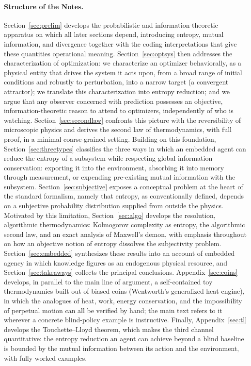 \documentclass[10pt]{article}
\theoremstyle{definition}
\theoremstyle{remark}
\begin{document}
\paragraph{Structure of the Notes.} Section~\ref{sec:prelim} develops the probabilistic and information-theoretic apparatus on which all later sections depend, introducing entropy, mutual information, and divergence together with the coding interpretations that give these quantities operational meaning. Section~\ref{sec:optsys} then addresses the characterization of optimization: we characterize an optimizer behaviorally, as a physical entity that drives the system it acts upon, from a broad range of initial conditions and robustly to perturbation, into a narrow target (a convergent attractor); we translate this characterization into entropy reduction; and we argue that any observer concerned with prediction possesses an objective, information-theoretic reason to attend to optimizers, independently of who is watching. Section~\ref{sec:secondlaw} confronts this picture with the reversibility of microscopic physics and derives the second law of thermodynamics, with full proof, in a minimal coarse-grained setting. Building on this foundation, Section~\ref{sec:threetypes} classifies the three ways in which an embedded agent can reduce the entropy of a subsystem while respecting global information conservation: exporting it into the environment, absorbing it into memory through measurement, or expending pre-existing mutual information with the subsystem. Section~\ref{sec:subjective} exposes a conceptual problem at the heart of the standard formalism, namely that entropy, as conventionally defined, depends on a subjective probability distribution supplied from outside the physics. Motivated by this limitation, Section~\ref{sec:algo} develops the resolution, algorithmic thermodynamics: Kolmogorov complexity as entropy, the algorithmic second law, and an exact analysis of Maxwell's demon, with emphasis throughout on how an objective notion of entropy dissolves the subjectivity problem. Section~\ref{sec:embedded} synthesizes these results into an account of embedded agency in which knowledge figures as an endogenous physical resource, and Section~\ref{sec:takeaways} collects the principal conclusions. Appendix~\ref{sec:coins} develops, in parallel to the main line of argument, a self-contained toy thermodynamics built out of biased coins (Wentworth's generalized heat engine), in which the analogues of heat, work, energy conservation, and the impossibility of perpetual motion can all be verified by hand; the main text refers to it wherever a concrete blind-policy example is instructive. Finally, Appendix~\ref{sec:tl} develops the Touchette--Lloyd theorem, which makes the third channel quantitative: the entropy reduction an agent can achieve beyond a blind baseline is bounded by the mutual information between its action and the environment, with fully worked examples.
\end{document}
